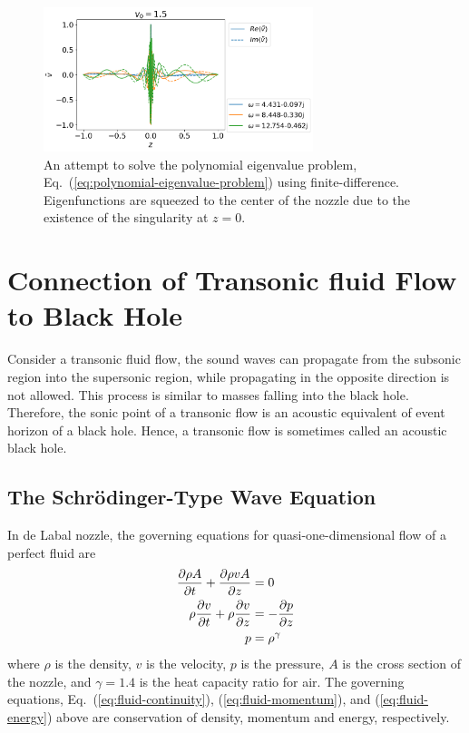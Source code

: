 \begin{figure} [htbp]
	\centering
	\includegraphics[width=0.7\textwidth]{figures/results-bad-accelerating-v}
	\caption{An attempt to solve the polynomial eigenvalue problem, Eq.~(\ref{eq:polynomial-eigenvalue-problem}) using finite-difference. Eigenfunctions are squeezed to the center of the nozzle due to the existence of the singularity at $z=0$.}
	\label{fig:failure-of-spectral-method}
\end{figure}

\section{Connection of Transonic fluid Flow to Black Hole}
Consider a transonic fluid flow, the sound waves can propagate from the subsonic region into the supersonic region, while propagating in the opposite direction is not allowed. This process is similar to masses falling into the black hole. Therefore, the sonic point of a transonic flow is an acoustic equivalent of event horizon of a black hole. Hence, a transonic flow is sometimes called an acoustic black hole. \cite{okuzumi_sakagami_quasinormal_2007}

\subsection{The Schr{\"o}dinger-Type Wave Equation}
In de Labal nozzle, the governing equations for quasi-one-dimensional flow of a perfect fluid are
\begin{align}
	\pdv{\rho A}{t}	+ \pdv{\rho vA}{z} & = 0            \label{eq:fluid-continuity} \\
	\rho\pdv{v}{t}	+ \rho\pdv{v}{z}    & = -\pdv{p}{z}  \label{eq:fluid-momentum}   \\
	p                                  & = \rho^\gamma \label{eq:fluid-energy}
\end{align}
where $\rho$ is the density, $v$ is the velocity, $p$ is the pressure, $A$ is the cross section of the nozzle, and $\gamma=1.4$ is the heat capacity ratio for air. The governing equations, Eq.~(\ref{eq:fluid-continuity}), (\ref{eq:fluid-momentum}), and (\ref{eq:fluid-energy}) above are conservation of density, momentum and energy, respectively.

